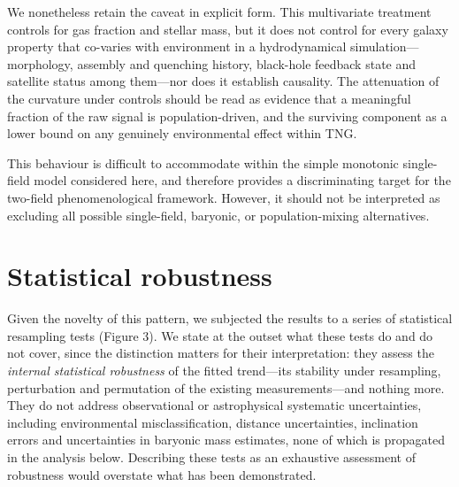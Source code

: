 \documentclass[11pt,a4paper]{article}
\begin{document}
We nonetheless retain the caveat in explicit form. This multivariate treatment controls for gas fraction and stellar mass, but it does not control for every galaxy property that co-varies with environment in a hydrodynamical simulation---morphology, assembly and quenching history, black-hole feedback state and satellite status among them---nor does it establish causality. The attenuation of the curvature under controls should be read as evidence that a meaningful fraction of the raw signal is population-driven, and the surviving component as a lower bound on any genuinely environmental effect within TNG.

This behaviour is difficult to accommodate within the simple monotonic single-field model considered here, and therefore provides a discriminating target for the two-field phenomenological framework. However, it should not be interpreted as excluding all possible single-field, baryonic, or population-mixing alternatives.


\section*{Statistical robustness}

Given the novelty of this pattern, we subjected the results to a series of statistical resampling tests (Figure 3). We state at the outset what these tests do and do not cover, since the distinction matters for their interpretation: they assess the \textit{internal statistical robustness} of the fitted trend---its stability under resampling, perturbation and permutation of the existing measurements---and nothing more. They do not address observational or astrophysical systematic uncertainties, including environmental misclassification, distance uncertainties, inclination errors and uncertainties in baryonic mass estimates, none of which is propagated in the analysis below. Describing these tests as an exhaustive assessment of robustness would overstate what has been demonstrated.
\end{document}
